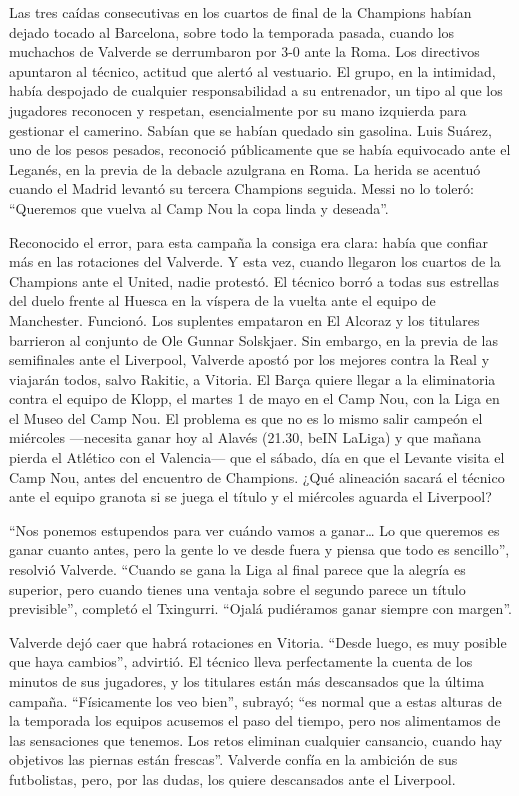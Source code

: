 Las tres caídas consecutivas en los cuartos de final de la Champions habían dejado tocado al Barcelona, sobre todo la temporada pasada, cuando los muchachos de Valverde se derrumbaron por 3-0 ante la Roma. Los directivos apuntaron al técnico, actitud que alertó al vestuario. El grupo, en la intimidad, había despojado de cualquier responsabilidad a su entrenador, un tipo al que los jugadores reconocen y respetan, esencialmente por su mano izquierda para gestionar el camerino. Sabían que se habían quedado sin gasolina. Luis Suárez, uno de los pesos pesados, reconoció públicamente que se había equivocado ante el Leganés, en la previa de la debacle azulgrana en Roma. La herida se acentuó cuando el Madrid levantó su tercera Champions seguida. Messi no lo toleró: ``Queremos que vuelva al Camp Nou la copa linda y deseada''.

Reconocido el error, para esta campaña la consiga era clara: había que confiar más en las rotaciones del Valverde. Y esta vez, cuando llegaron los cuartos de la Champions ante el United, nadie protestó. El técnico borró a todas sus estrellas del duelo frente al Huesca en la víspera de la vuelta ante el equipo de Manchester. Funcionó. Los suplentes empataron en El Alcoraz y los titulares barrieron al conjunto de Ole Gunnar Solskjaer. Sin embargo, en la previa de las semifinales ante el Liverpool, Valverde apostó por los mejores contra la Real y viajarán todos, salvo Rakitic, a Vitoria. El Barça quiere llegar a la eliminatoria contra el equipo de Klopp, el martes 1 de mayo en el Camp Nou, con la Liga en el Museo del Camp Nou. El problema es que no es lo mismo salir campeón el miércoles —necesita ganar hoy al Alavés (21.30, beIN LaLiga) y que mañana pierda el Atlético con el Valencia— que el sábado, día en que el Levante visita el Camp Nou, antes del encuentro de Champions. ¿Qué alineación sacará el técnico ante el equipo granota si se juega el título y el miércoles aguarda el Liverpool?

``Nos ponemos estupendos para ver cuándo vamos a ganar… Lo que queremos es ganar cuanto antes, pero la gente lo ve desde fuera y piensa que todo es sencillo'', resolvió Valverde. ``Cuando se gana la Liga al final parece que la alegría es superior, pero cuando tienes una ventaja sobre el segundo parece un título previsible'', completó el Txingurri. ``Ojalá pudiéramos ganar siempre con margen''.

Valverde dejó caer que habrá rotaciones en Vitoria. ``Desde luego, es muy posible que haya cambios'', advirtió. El técnico lleva perfectamente la cuenta de los minutos de sus jugadores, y los titulares están más descansados que la última campaña. ``Físicamente los veo bien'', subrayó; ``es normal que a estas alturas de la temporada los equipos acusemos el paso del tiempo, pero nos alimentamos de las sensaciones que tenemos. Los retos eliminan cualquier cansancio, cuando hay objetivos las piernas están frescas''. Valverde confía en la ambición de sus futbolistas, pero, por las dudas, los quiere descansados ante el Liverpool.


